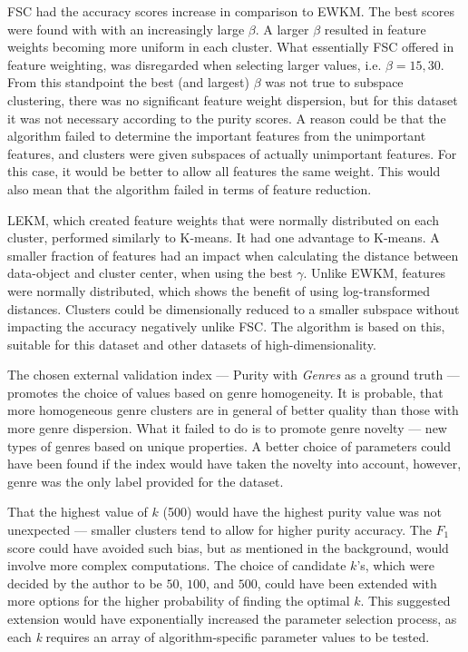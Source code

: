 \documentclass[../report.tex]{subfiles}
\begin{document}
FSC had the accuracy scores increase in comparison to EWKM. The best scores were found with with an increasingly large $\beta$. A larger $\beta$ resulted in feature weights becoming more uniform in each cluster. What essentially FSC offered in feature weighting, was disregarded when selecting larger values, i.e. $\beta=15,30$. From this standpoint the best (and largest) $\beta$ was not true to subspace clustering, there was no significant feature weight dispersion, but for this dataset it was not necessary according to the purity scores. A reason could be that the algorithm failed to determine the important features from the unimportant features, and clusters were given subspaces of actually unimportant features. For this case, it would be better to allow all features the same weight. This would also mean that the algorithm failed in terms of feature reduction.

LEKM, which created feature weights that were normally distributed on each cluster, performed similarly to K-means. It had one advantage to K-means. A smaller fraction of features had an impact when calculating the distance between data-object and cluster center, when using the best $\gamma$. Unlike EWKM, features were normally distributed, which shows the benefit of using log-transformed distances. Clusters could be dimensionally reduced to a smaller subspace without impacting the accuracy negatively unlike FSC. The algorithm is based on this, suitable for this dataset and other datasets of high-dimensionality.

The chosen external validation index --- Purity with \textit{Genres} as a ground truth --- promotes the choice of values based on genre homogeneity. It is probable, that more homogeneous genre clusters are in general of better quality than those with more genre dispersion. What it failed to do is to promote genre novelty --- new types of genres based on unique properties. A better choice of parameters could have been found if the index would have taken the novelty into account, however, genre was the only label provided for the dataset.

That the highest value of $k$ (500) would have the highest purity value was not unexpected --- smaller clusters tend to allow for higher purity accuracy. The $F_1$ score could have avoided such bias, but as mentioned in the background, would involve more complex computations. The choice of candidate $k$'s, which were decided by the author to be $50$, $100$, and $500$, could have been extended with more options for the higher probability of finding the optimal $k$. This suggested extension would have exponentially increased the parameter selection process, as each \textit{k} requires an array of algorithm-specific parameter values to be tested.
\end{document}
